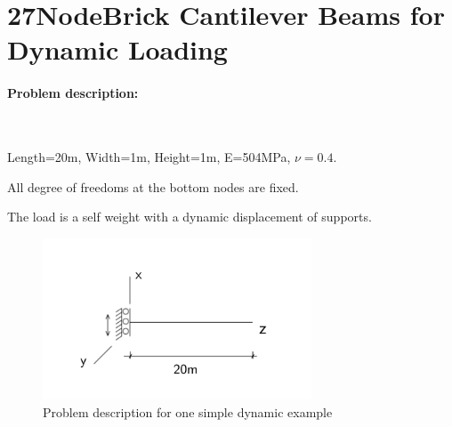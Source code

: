 























\section{27NodeBrick Cantilever Beams for Dynamic Loading}



\paragraph{Problem description:} ~



Length=20m, Width=1m, Height=1m, E=504MPa, $\nu=0.4$. 

All degree of freedoms at the bottom nodes are fixed. 

The load is a self weight with a dynamic displacement of supports.


\begin{figure}[!htb]
  \centering
  \includegraphics[width=8cm]{./Figure-files/_Chapter_Appendix_Illustrative_Examples/dynamic_example_diagram.pdf}
  \caption{Problem description for one simple dynamic example}
  \label{fig Problem description for one simple dynamic example}
\end{figure}



